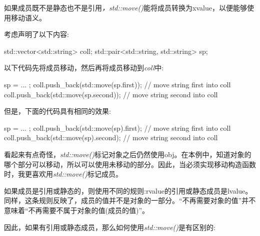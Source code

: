 如果成员既不是静态也不是引用\textit{，std::\allowbreak{}move(\allowbreak{})\allowbreak{}}能将成员转换为xvalue，以便能够使用移动语义。\par

考虑声明了以下内容:\par

\begin{codebox}[cpp]
std::vector<std::string> coll;
std::pair<std::string, std::string> sp;
\end{codebox}

以下代码先将成员移动，然后再将成员移动到\textit{coll}中:\par

\begin{codebox}[cpp]
sp = ... ;
coll.push_back(std::move(sp.first)); // move string first into coll
coll.push_back(std::move(sp.second)); // move string second into coll
\end{codebox}

但是，下面的代码具有相同的效果:\par

\begin{codebox}[cpp]
sp = ... ;
coll.push_back(std::move(sp).first); // move string first into coll
coll.push_back(std::move(sp).second); // move string second into coll
\end{codebox}

看起来有点奇怪，\textit{std::move()}标记对象之后仍然使用obj。在本例中，知道对象的哪个部分可以移动，所以可以使用未移动的部分。因此，当必须实现移动构造函数时，我更喜欢用\textit{std::move()}标记成员。\par


如果成员是引用或静态的，则使用不同的规则:rvalue的引用或静态成员是lvalue。同样，这条规则反映了，成员的值并不是对象的一部分。“不再需要对象的值”并不意味着“不再需要不属于对象的值(成员的值)”。\par

因此，如果有引用或静态成员，那么如何使用\textit{std::move()}是有区别的:\par

